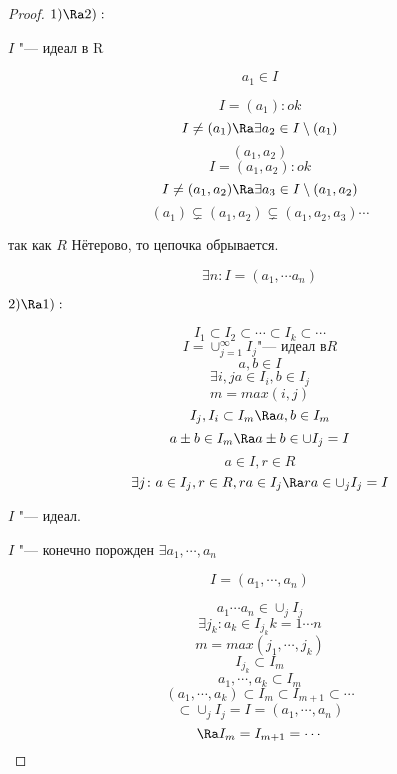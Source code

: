\begin{proof}
\textbf{$1) \Ra 2):$}

$I$ "--- идеал в R

$$a_1 \in I$$

$$I = (a_1)\colon ok$$
$$I \ne (a_1) \Ra \exists a_2 \in I \setminus (a_1)$$
$$(a_1, a_2)$$
$$I = (a_1, a_2)\colon ok$$
$$I \ne (a_1, a_2) \Ra \exists a_3 \in I \setminus (a_1, a_2)$$
$$(a_1) \subsetneq (a_1, a_2) \subsetneq (a_1, a_2, a_3) \cdots$$

так как $R$ Нётерово, то цепочка обрывается. 

$$\exists n \colon I = (a_1, \cdots a_n)$$

\textbf{$2) \Ra 1):$}

$$I_{1} \subset I_2 \subset \cdots \subset I_{k} \subset \cdots$$
$$I = \cup_{j = 1}^{\infty} I_{j} \text{"--- идеал в} R$$
$$a, b \in I$$
$$\exists i, j a \in I_{i}, b \in I_{j}$$
$$m = max(i, j)$$
$$I_j, I_i \subset I_{m} \Ra a, b \in I_{m}$$
$$a\pm b \in I_m \Ra a \pm b \in \cup I_{j} = I$$
$$a \in I, r \in R$$
$$\exists j \colon a \in I_j, r \in R, ra \in I_{j} \Ra ra \in \cup_{j}I_j = I$$

$I$ "--- идеал. 

$I$ "--- конечно порожден $\exists a_1, \cdots, a_n$

$$I = (a_1, \cdots, a_n)$$

$$a_1 \cdots a_n \in \cup_{j} I_j$$
$$\exists j_k\colon a_k \in I_{j_k} k = 1 \cdots n$$
$$m =max(j_1, \cdots, j_k)$$
$$I_{j_{k}} \subset I_m$$
$$a_1, \cdots, a_k \subset I_{m}$$
$$(a_1, \cdots, a_k) \subset I_m \subset I_{m + 1} \subset \cdots$$
$$\subset \cup_{j} I_{j} = I = (a_1, \cdots, a_n)$$
$$\Ra I_m = I_{m + 1} = \cdots$$
\end{proof}
